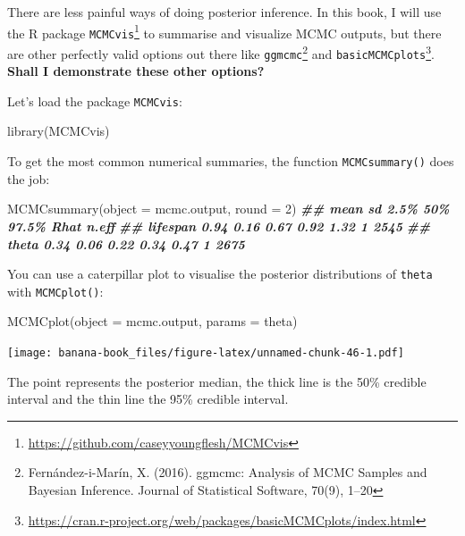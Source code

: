 \documentclass[
  12pt,
]{krantz}
\newenvironment{Shaded}{\begin{snugshade}}{\end{snugshade}}
\newcommand{\AttributeTok}[1]{\textcolor[rgb]{0.77,0.63,0.00}{#1}}
\newcommand{\DecValTok}[1]{\textcolor[rgb]{0.00,0.00,0.81}{#1}}
\newcommand{\DocumentationTok}[1]{\textcolor[rgb]{0.56,0.35,0.01}{\textbf{\textit{#1}}}}
\newcommand{\FunctionTok}[1]{\textcolor[rgb]{0.00,0.00,0.00}{#1}}
\newcommand{\NormalTok}[1]{#1}
\newcommand{\StringTok}[1]{\textcolor[rgb]{0.31,0.60,0.02}{#1}}
\begin{document}
There are less painful ways of doing posterior inference. In this book, I will use the R package \texttt{MCMCvis}\footnote{\url{https://github.com/caseyyoungflesh/MCMCvis}} to summarise and visualize MCMC outputs, but there are other perfectly valid options out there like \texttt{ggmcmc}\footnote{Fernández-i-Marín, X. (2016). ggmcmc: Analysis of MCMC Samples and Bayesian Inference. Journal of Statistical Software, 70(9), 1--20} and \texttt{basicMCMCplots}\footnote{\url{https://cran.r-project.org/web/packages/basicMCMCplots/index.html}}. \textbf{Shall I demonstrate these other options?}

Let's load the package \texttt{MCMCvis}:

\begin{Shaded}
\begin{Highlighting}[]
\FunctionTok{library}\NormalTok{(MCMCvis)}
\end{Highlighting}
\end{Shaded}

To get the most common numerical summaries, the function \texttt{MCMCsummary()} does the job:

\begin{Shaded}
\begin{Highlighting}[]
\FunctionTok{MCMCsummary}\NormalTok{(}\AttributeTok{object =}\NormalTok{ mcmc.output, }\AttributeTok{round =} \DecValTok{2}\NormalTok{)}
\DocumentationTok{\#\#          mean   sd 2.5\%  50\% 97.5\% Rhat n.eff}
\DocumentationTok{\#\# lifespan 0.94 0.16 0.67 0.92  1.32    1  2545}
\DocumentationTok{\#\# theta    0.34 0.06 0.22 0.34  0.47    1  2675}
\end{Highlighting}
\end{Shaded}

You can use a caterpillar plot to visualise the posterior distributions of \texttt{theta} with \texttt{MCMCplot()}:

\begin{Shaded}
\begin{Highlighting}[]
\FunctionTok{MCMCplot}\NormalTok{(}\AttributeTok{object =}\NormalTok{ mcmc.output, }
         \AttributeTok{params =} \StringTok{\textquotesingle{}theta\textquotesingle{}}\NormalTok{)}
\end{Highlighting}
\end{Shaded}

\texttt{[image: banana-book\_files/figure-latex/unnamed-chunk-46-1.pdf]}

The point represents the posterior median, the thick line is the 50\% credible interval and the thin line the 95\% credible interval.
\end{document}
